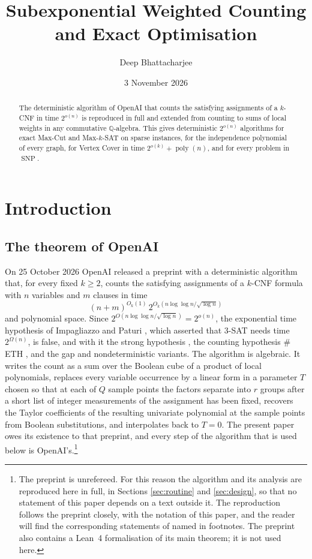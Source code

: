 \documentclass[11pt,reqno]{amsart}
\title[Subexponential weighted counting]{Subexponential Weighted Counting and Exact Optimisation}
\author{Deep Bhattacharjee}
\date{3 November 2026}
\numberwithin{equation}{section}
\theoremstyle{plain}
\theoremstyle{definition}
\theoremstyle{remark}
\DeclareMathOperator{\poly}{poly}
\DeclareMathOperator{\SNP}{SNP}
\newcommand{\Q}{\mathbb{Q}}
\newcommand{\oai}{OpenAI}
\begin{document}
\begin{abstract}
The deterministic algorithm of OpenAI that counts the satisfying assignments of a $k$-CNF in time $2^{o(n)}$ is reproduced in full and extended from counting to sums of local weights in any commutative $\Q$-algebra. This gives deterministic $2^{o(n)}$ algorithms for exact Max-Cut and Max-$k$-SAT on sparse instances, for the independence polynomial of every graph, for Vertex Cover in time $2^{o(k)}+\poly(n)$, and for every problem in $\SNP$.
\end{abstract}

\maketitle

\section{Introduction}\label{sec:intro}

\subsection{The theorem of \oai{}}
On 25 October 2026 \oai{} released a preprint \cite{OAI26} with a deterministic
algorithm that, for every fixed $k\ge 2$, counts the satisfying assignments of a
$k$-CNF formula with $n$ variables and $m$ clauses in time
\begin{equation}\label{eq:oaitime}
  (n+m)^{O_k(1)}\, 2^{O_k(n\log\log n/\sqrt{\log n})}
\end{equation}
and polynomial space. Since $2^{O(n\log\log n/\sqrt{\log n})}=2^{o(n)}$, the
exponential time hypothesis of Impagliazzo and Paturi \cite{IP01}, which asserted
that $3$-SAT needs time $2^{\Omega(n)}$, is false, and with it the strong
hypothesis \cite{IPZ01}, the counting hypothesis $\#$ETH \cite{DHMTW14}, and the
gap and nondeterministic variants. The algorithm is algebraic. It writes the
count as a sum over the Boolean cube of a product of local polynomials, replaces
every variable occurrence by a linear form in a parameter $T$ chosen so that at
each of $Q$ sample points the factors separate into $r$ groups after a short
list of integer measurements of the assignment has been fixed, recovers the
Taylor coefficients of the resulting univariate polynomial at the sample points
from Boolean substitutions, and interpolates back to $T=0$. The present paper
owes its existence to that preprint, and every step of the algorithm that is used
below is \oai{}'s.\footnote{The preprint is unrefereed. For this reason the
algorithm and its analysis are reproduced here in full, in Sections
\ref{sec:routine} and \ref{sec:design}, so that no statement of this paper
depends on a text outside it. The reproduction follows the preprint closely, with
the notation of this paper, and the reader will find the corresponding statements
of \cite{OAI26} named in footnotes. The preprint also contains a Lean~4
formalisation of its main theorem; it is not used here.}
\end{document}
